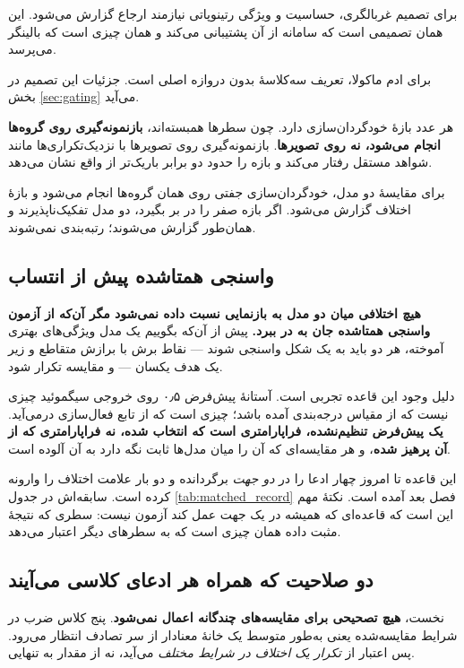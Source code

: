 برای تصمیم غربالگری، حساسیت و ویژگی رتینوپاتی نیازمند ارجاع گزارش می‌شود. این همان تصمیمی است
که سامانه از آن پشتیبانی می‌کند و همان چیزی است که بالینگر می‌پرسد.

برای ادم ماکولا، تعریف سه‌کلاسهٔ بدون دروازه اصلی است. جزئیات این تصمیم در بخش
\ref{sec:gating} می‌آید.

هر عدد بازهٔ خودگردان‌سازی دارد. چون سطرها همبسته‌اند، \textbf{بازنمونه‌گیری روی گروه‌ها انجام
می‌شود، نه روی تصویرها}. بازنمونه‌گیری روی تصویرها با نزدیک‌تکراری‌ها مانند شواهد مستقل رفتار
می‌کند و بازه را حدود دو برابر باریک‌تر از واقع نشان می‌دهد.

برای مقایسهٔ دو مدل، خودگردان‌سازی جفتی روی همان گروه‌ها انجام می‌شود و بازهٔ اختلاف گزارش
می‌شود. اگر بازه صفر را در بر بگیرد، دو مدل تفکیک‌ناپذیرند و همان‌طور گزارش می‌شوند؛ رتبه‌بندی
نمی‌شوند.

\subsection{واسنجی همتاشده پیش از انتساب}
\label{sec:matched}

\textbf{هیچ اختلافی میان دو مدل به بازنمایی نسبت داده نمی‌شود مگر آن‌که از آزمون واسنجی همتاشده
جان به در ببرد.} پیش از آن‌که بگوییم یک مدل ویژگی‌های بهتری آموخته، هر دو باید به یک شکل واسنجی
شوند — نقاط برش با برازش متقاطع و زیر یک هدف یکسان — و مقایسه تکرار شود.

دلیل وجود این قاعده تجربی است. آستانهٔ پیش‌فرض \num{۰٫۵} روی خروجی سیگموئید چیزی نیست که از مقیاس
درجه‌بندی آمده باشد؛ چیزی است که از تابع فعال‌سازی درمی‌آید. \textbf{یک پیش‌فرض تنظیم‌نشده،
فراپارامتری است که انتخاب شده، نه فراپارامتری که از آن پرهیز شده}، و هر مقایسه‌ای که آن را
میان مدل‌ها ثابت نگه دارد به آن آلوده است.

این قاعده تا امروز چهار ادعا را در \emph{دو جهت} برگردانده و دو بار علامت اختلاف را وارونه
کرده است. سابقه‌اش در جدول \ref{tab:matched_record} فصل بعد آمده است. نکتهٔ مهم این است که
قاعده‌ای که همیشه در یک جهت عمل کند آزمون نیست: سطری که نتیجهٔ مثبت داده همان چیزی است که به
سطرهای دیگر اعتبار می‌دهد.

\subsection{دو صلاحیت که همراه هر ادعای کلاسی می‌آیند}

نخست، \textbf{هیچ تصحیحی برای مقایسه‌های چندگانه اعمال نمی‌شود}. پنج کلاس ضرب در شرایط
مقایسه‌شده یعنی به‌طور متوسط یک خانهٔ معنادار از سر تصادف انتظار می‌رود. پس اعتبار از
\emph{تکرار یک اختلاف در شرایط مختلف} می‌آید، نه از مقدار  به تنهایی.

